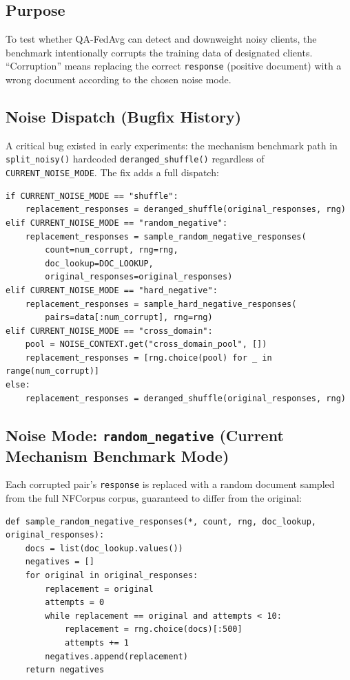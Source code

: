 \documentclass[12pt,a4paper]{article}
\begin{document}
\subsection{Purpose}

To test whether QA-FedAvg can detect and downweight noisy clients, the benchmark intentionally corrupts the training data of designated clients. ``Corruption'' means replacing the correct \texttt{response} (positive document) with a wrong document according to the chosen noise mode.

\subsection{Noise Dispatch (Bugfix History)}

A critical bug existed in early experiments: the mechanism benchmark path in \texttt{split\_noisy()} hardcoded \texttt{deranged\_shuffle()} regardless of \texttt{CURRENT\_NOISE\_MODE}. The fix adds a full dispatch:

\begin{lstlisting}[caption={Fixed noise dispatch in split\_noisy() for mechanism mode}]
if CURRENT_NOISE_MODE == "shuffle":
    replacement_responses = deranged_shuffle(original_responses, rng)
elif CURRENT_NOISE_MODE == "random_negative":
    replacement_responses = sample_random_negative_responses(
        count=num_corrupt, rng=rng,
        doc_lookup=DOC_LOOKUP,
        original_responses=original_responses)
elif CURRENT_NOISE_MODE == "hard_negative":
    replacement_responses = sample_hard_negative_responses(
        pairs=data[:num_corrupt], rng=rng)
elif CURRENT_NOISE_MODE == "cross_domain":
    pool = NOISE_CONTEXT.get("cross_domain_pool", [])
    replacement_responses = [rng.choice(pool) for _ in range(num_corrupt)]
else:
    replacement_responses = deranged_shuffle(original_responses, rng)
\end{lstlisting}

\subsection{Noise Mode: \texttt{random\_negative} (Current Mechanism Benchmark Mode)}

Each corrupted pair's \texttt{response} is replaced with a random document sampled from the full NFCorpus corpus, guaranteed to differ from the original:

\begin{lstlisting}[caption={Random negative sampling}]
def sample_random_negative_responses(*, count, rng, doc_lookup, original_responses):
    docs = list(doc_lookup.values())
    negatives = []
    for original in original_responses:
        replacement = original
        attempts = 0
        while replacement == original and attempts < 10:
            replacement = rng.choice(docs)[:500]
            attempts += 1
        negatives.append(replacement)
    return negatives
\end{lstlisting}
\end{document}
